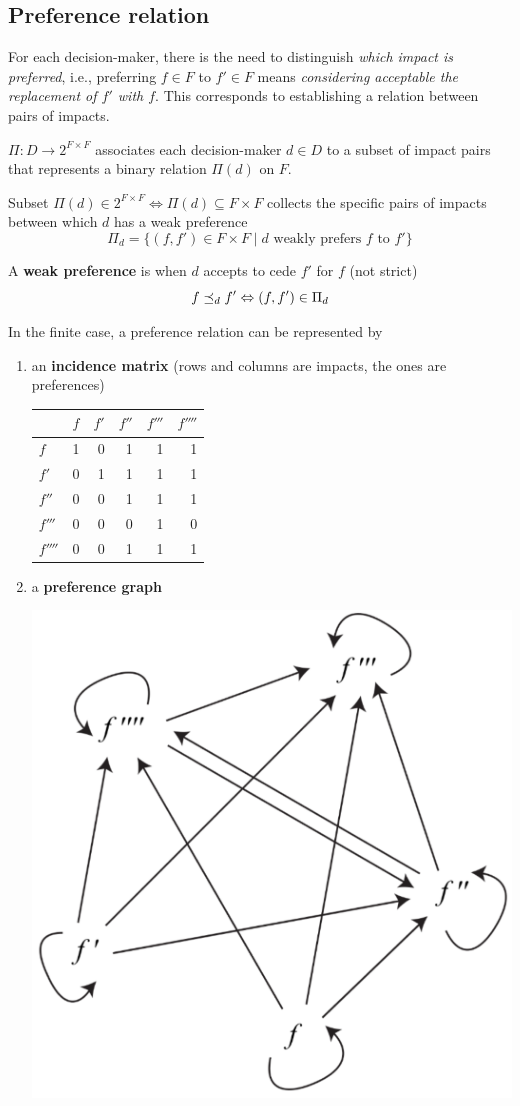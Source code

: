 \subsection{Preference relation}
\label{subsec:prefreltiondef}

For each decision-maker, there is the need to distinguish \textit{which impact is preferred}, i.e., preferring $f \in F$ to $f' \in F$ means \textit{considering acceptable the replacement of $f'$ with $f$}. This corresponds to establishing a relation between pairs of impacts.

$\Pi: D \rightarrow 2^{F \times F}$ associates each decision-maker $d \in D$ to a subset of impact pairs that represents a binary relation $\Pi (d)$ on $F$.

Subset $\Pi(d) \in 2^{F \times F} \Leftrightarrow \Pi(d) \subseteq F \times F$ collects the specific pairs of impacts between which $d$ has a weak preference
$$ \Pi_d = \{(f, f') \in F \times F \mid d \text{ weakly prefers } f \text{ to } f'\} $$

\begin{definition}
	A \textbf{weak preference} is when $d$ accepts to cede $f'$ for $f$ (not strict)
	$$ f \preceq_{d} f' \Leftrightarrow (f, f') \in \Pi_d$$
\end{definition} 

In the finite case, a preference relation can be represented by
\begin{enumerate}
	\item an \textbf{incidence matrix} (rows and columns are impacts, the ones are preferences)
	\begin{center}
		\begin{tabular}{@{}l|rrrrr@{}}
			\toprule
			& $f$ & $f'$ & $f''$ & $f'''$ & $f''''$ \\
			\midrule
			$f$   & 1 &  0 & 1 & 1 & 1 \\
			$f'$  & 0 & 1 & 1 & 1 & 1 \\
			$f''$  & 0 &  0 & 1 &  1 & 1 \\
			$f'''$ & 0 &  0 & 0 & 1 & 0 \\
			$f''''$ & 0 & 0 & 1 & 1 & 1 \\
			\bottomrule
		\end{tabular}
	\end{center}
	
	\item a \textbf{preference graph}
	\begin{center}
		\includegraphics[width=0.45\columnwidth]{img/dp/fundamentaldefinitions/graph1}
	\end{center}
\end{enumerate}

